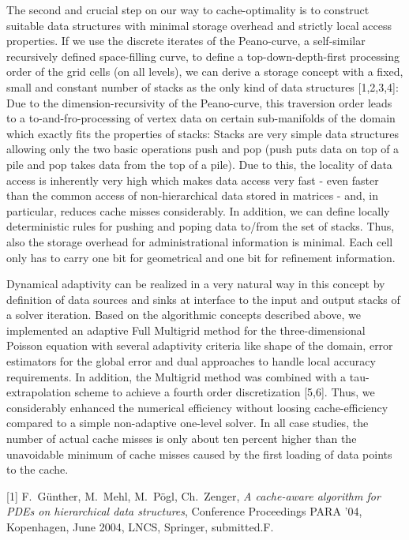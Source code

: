 \documentclass{report}
\begin{document}
The second and crucial step on our way to cache-optimality is to
construct suitable data structures with minimal storage overhead and
strictly local access properties. If we use the discrete iterates of
the Peano-curve, a self-similar recursively defined space-filling
curve, to define a top-down-depth-first processing order of the grid
cells (on all levels), we can derive a storage concept with a fixed,
small and constant number of stacks as the only kind of data structures
[1,2,3,4]: Due to the dimension-recursivity of the Peano-curve, this
traversion order leads to a to-and-fro-processing of vertex data on
certain sub-manifolds of the domain which exactly fits the properties
of stacks: Stacks are very simple data structures allowing only the two
basic operations push and pop (push puts data on top of a pile and pop
takes data from the top of a pile). Due to this, the locality of data
access is inherently very high which makes data access very fast - even
faster than the common access of non-hierarchical data stored in
matrices - and, in particular, reduces cache misses considerably. In
addition, we can define locally deterministic rules for pushing and
poping data to/from the set of stacks. Thus, also the storage overhead
for administrational information is minimal. Each cell only has to
carry one bit for geometrical and one bit for refinement information.

Dynamical adaptivity can be realized in a very natural way in this
concept by definition of data sources and sinks at interface to the
input and output stacks of a solver iteration. Based on the algorithmic
concepts described above, we implemented an adaptive Full Multigrid
method for the three-dimensional Poisson equation with several
adaptivity criteria like shape of the domain, error estimators for the
global error and dual approaches to handle local accuracy requirements.
In addition, the Multigrid method was combined with a tau-extrapolation
scheme to achieve a fourth order discretization [5,6]. Thus, we
considerably enhanced the numerical efficiency without loosing
cache-efficiency compared to a simple non-adaptive one-level solver. In
all case studies, the number of actual cache misses is only about ten
percent higher than the unavoidable minimum of cache misses caused by
the first loading of data points to the cache.

[1] F.~G\"{u}nther, M.~Mehl, M.~P\"{o}gl, Ch.~Zenger,
{\em A cache-aware
algorithm for PDEs on hierarchical data structures},
Conference Proceedings PARA '04, Kopenhagen, June 2004,
LNCS, Springer, submitted.F.
\end{document}
